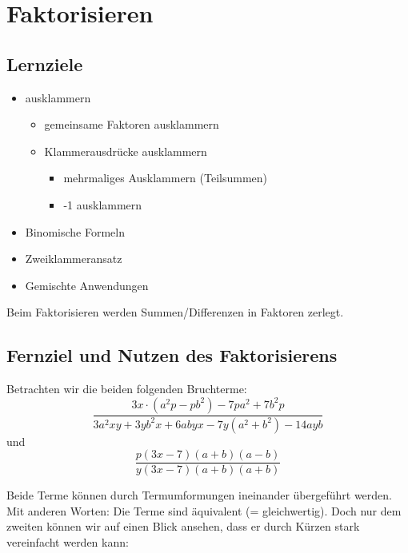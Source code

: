 \newpage
\section{Faktorisieren}

\subsection*{Lernziele}

\begin{itemize}
\item ausklammern
 \begin{itemize}
  \item gemeinsame Faktoren ausklammern
  \item Klammerausdrücke ausklammern
   \begin{itemize}
   \item mehrmaliges Ausklammern (Teilsummen)
  \item -1 ausklammern
  \end{itemize}
\end{itemize}
\item Binomische Formeln
\item Zweiklammeransatz
\item Gemischte Anwendungen
\end{itemize}


\newpage


Beim Faktorisieren werden Summen/Differenzen in Faktoren
zerlegt.


\subsection*{Fernziel und Nutzen des Faktorisierens}
Betrachten wir die beiden folgenden Bruchterme:
 $$\frac{3x\cdot{}(a^2p - pb^2) - 7pa^2 + 7b^2p}{3a^2xy  + 3yb^2x + 6abyx - 7y(a^2 +b^2) - 14ayb }$$
und
$$\frac{p(3x-7)(a+b)(a-b)}{y(3x-7)(a+b)(a+b)}$$

Beide Terme können durch Termumformungen ineinander übergeführt
werden. Mit anderen Worten: Die Terme sind äquivalent (= gleichwertig). Doch nur dem zweiten können wir auf einen Blick ansehen, dass er durch Kürzen stark vereinfacht werden kann:

